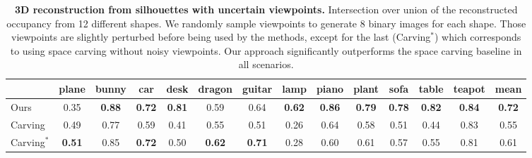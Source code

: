 \begingroup
\setlength{\tabcolsep}{2pt} %
\renewcommand{\arraystretch}{1.5} %
\begin{table}
\footnotesize
\centering
{
    \begin{tabular}{l|c|c|c|c|c|c|c|c|c|c|c|c||c}
    & plane & bunny & car & desk & dragon & guitar & lamp & piano & plant & sofa & table & teapot & mean \\
    \hline
    Ours & 0.35 & \textbf{0.88} & \textbf{0.72} & \textbf{0.81} & 0.59 & 0.64 & \textbf{0.62} & \textbf{0.86} & \textbf{0.79} & \textbf{0.78} & \textbf{0.82} & \textbf{0.84} & \textbf{0.72} \\
    Carving & 0.49 & 0.77 & 0.59 & 0.41 & 0.55 & 0.51 & 0.26 & 0.64 & 0.58 & 0.51 & 0.44 & 0.83 & 0.55 \\
    \hline
    Carving$\mathbf{^*}$ & \textbf{0.51} & 0.85 & \textbf{0.72} & 0.50 & \textbf{0.62} & \textbf{0.71} & 0.28 & 0.60 & 0.61 & 0.57 & 0.55 & 0.81 & 0.61 \\
    \end{tabular}
}
\caption{
        \label{tab:rec}
        \textbf{3D reconstruction from silhouettes with uncertain viewpoints.}
        Intersection over union of the reconstructed occupancy from 12 different shapes.
        We randomly sample viewpoints to generate 8 binary images for each shape.
        Those viewpoints are slightly perturbed before being used by the methods, except for the last (Carving$^*$) which corresponds to using space carving
        without noisy viewpoints.
        Our approach significantly outperforms the space carving baseline in all
        scenarios.
}
\end{table}
\endgroup


